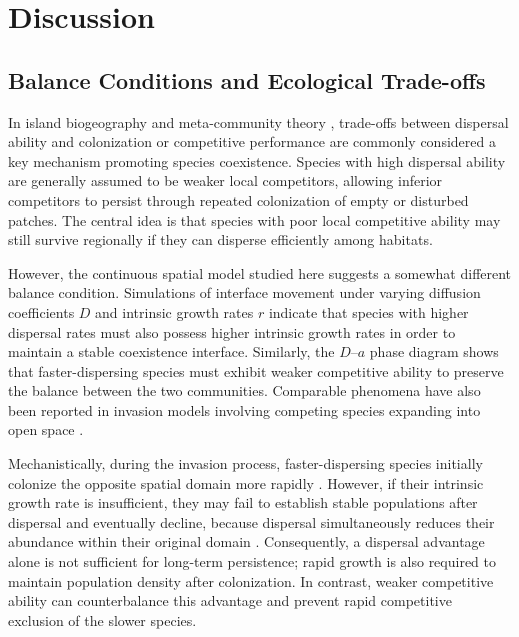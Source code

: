 \section{Discussion}

\subsection{Balance Conditions and Ecological Trade-offs}

In island biogeography \citep{macarthur_theory_2001} and meta-community theory \citep{hubbell_unified_2001, loreau_meta-ecosystems_2003}, trade-offs between dispersal ability and colonization or competitive performance are commonly considered a key mechanism promoting species coexistence. Species with high dispersal ability are generally assumed to be weaker local competitors, allowing inferior competitors to persist through repeated colonization of empty or disturbed patches. The central idea is that species with poor local competitive ability may still survive regionally if they can disperse efficiently among habitats.

However, the continuous spatial model studied here suggests a somewhat different balance condition. Simulations of interface movement under varying diffusion coefficients $D$ and intrinsic growth rates $r$ indicate that species with higher dispersal rates must also possess higher intrinsic growth rates in order to maintain a stable coexistence interface. Similarly, the $D$--$a$ phase diagram shows that faster-dispersing species must exhibit weaker competitive ability to preserve the balance between the two communities. Comparable phenomena have also been reported in invasion models involving competing species expanding into open space \citep{girardin_invasion_2019}.

Mechanistically, during the invasion process, faster-dispersing species initially colonize the opposite spatial domain more rapidly \citep{namba_spatial_1980}. However, if their intrinsic growth rate is insufficient, they may fail to establish stable populations after dispersal and eventually decline, because dispersal simultaneously reduces their abundance within their original domain \citep{dockery_evolution_1998}. Consequently, a dispersal advantage alone is not sufficient for long-term persistence; rapid growth is also required to maintain population density after colonization. In contrast, weaker competitive ability can counterbalance this advantage and prevent rapid competitive exclusion of the slower species.

